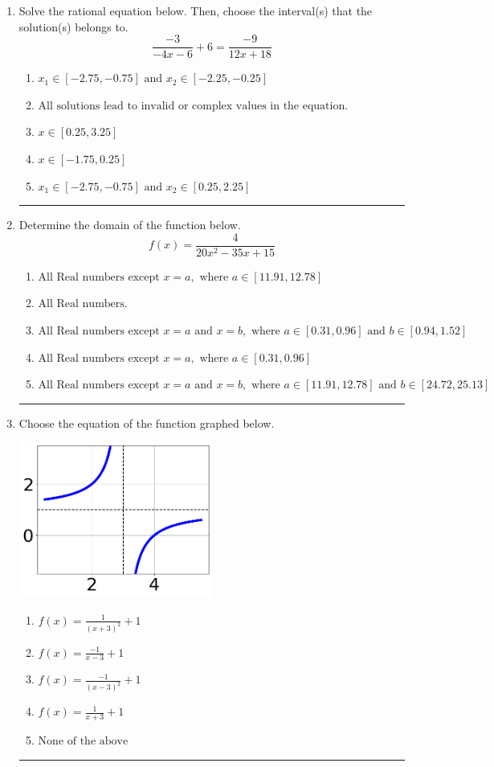 \documentclass[14pt]{extbook}
\newcommand{\litem}[1]{\item#1\hspace*{-1cm}\rule{\textwidth}{0.4pt}}
\begin{document}
\begin{enumerate}
\litem{
Solve the rational equation below. Then, choose the interval(s) that the solution(s) belongs to.\[ \frac{-3}{-4x -6} + 6 = \frac{-9}{12x + 18} \]\begin{enumerate}[label=\Alph*.]
\item \( x_1 \in [-2.75, -0.75] \text{ and } x_2 \in [-2.25,-0.25] \)
\item \( \text{All solutions lead to invalid or complex values in the equation.} \)
\item \( x \in [0.25,3.25] \)
\item \( x \in [-1.75,0.25] \)
\item \( x_1 \in [-2.75, -0.75] \text{ and } x_2 \in [0.25,2.25] \)

\end{enumerate} }
\litem{
Determine the domain of the function below.\[ f(x) = \frac{4}{20x^{2} -35 x + 15} \]\begin{enumerate}[label=\Alph*.]
\item \( \text{All Real numbers except } x = a, \text{ where } a \in [11.91, 12.78] \)
\item \( \text{All Real numbers.} \)
\item \( \text{All Real numbers except } x = a \text{ and } x = b, \text{ where } a \in [0.31, 0.96] \text{ and } b \in [0.94, 1.52] \)
\item \( \text{All Real numbers except } x = a, \text{ where } a \in [0.31, 0.96] \)
\item \( \text{All Real numbers except } x = a \text{ and } x = b, \text{ where } a \in [11.91, 12.78] \text{ and } b \in [24.72, 25.13] \)

\end{enumerate} }
\litem{
Choose the equation of the function graphed below.
\begin{center}
    \includegraphics[width=0.5\textwidth]{../Figures/rationalGraphToEquationCopyA.png}
\end{center}
\begin{enumerate}[label=\Alph*.]
\item \( f(x) = \frac{1}{(x + 3)^2} + 1 \)
\item \( f(x) = \frac{-1}{x - 3} + 1 \)
\item \( f(x) = \frac{-1}{(x - 3)^2} + 1 \)
\item \( f(x) = \frac{1}{x + 3} + 1 \)
\item \( \text{None of the above} \)


\end{enumerate}}
\end{enumerate}
\end{document}
